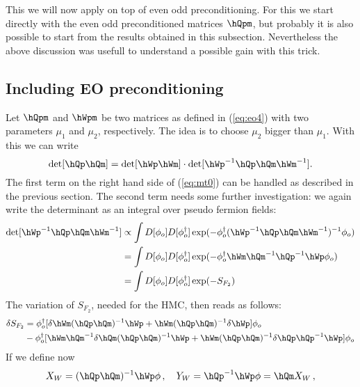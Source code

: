 This we will now apply on top of even odd preconditioning. For this we
start directly with the even odd preconditioned matrices $\hQpm$, but
probably it is also possible to start from the results obtained in
this subsection. Nevertheless the above discussion was usefull to
understand a possible gain with this trick.

\subsection{Including EO preconditioning}

Let $\hQpm$ and $\hWpm$ be two matrices as defined in (\ref{eq:eo4})
with two parameters $\mu_1$ and $\mu_2$, respectively. The idea is to
choose $\mu_2$ bigger than $\mu_1$. With this we can
write
\begin{equation}
  \label{eq:mt0}
  \det[\hQp\hQm] = \det[\hWp\hWm]\cdot\det[\hWp^{-1}\hQp\hQm\hWm^{-1}].
\end{equation}
The first term on the right hand side of (\ref{eq:mt0}) can be handled
as described in the previous section. The second term needs some
further investigation: we again write the determinant as an integral
over pseudo fermion fields:
\begin{equation}
  \label{eq:mt1}
  \begin{split}
    \det[\hWp^{-1}\hQp\hQm\hWm^{-1}]  &\propto \int
    D[\phi_o]D[\phi_o^\dagger]\exp(-\phi_o^\dagger (\hWp^{-1}\hQp\hQm\hWm^{-1})^{-1}
    \phi_o) \\
    &= \int D[\phi_o]D[\phi_o^\dagger]\exp(-\phi_o^\dagger \hWm\hQm^{-1}\hQp^{-1}\hWp\phi_o) \\
    &= \int D[\phi_o]D[\phi_o^\dagger]\exp(-S_{F_2})
  \end{split}
\end{equation}
The variation of $S_{F_2}$, needed for the HMC, then reads as follows:
\begin{equation}
  \label{eq:mt2}
  \begin{split}
    \delta S_{F_2} &= \phi_o^\dagger[\delta\hWm(\hQp\hQm)^{-1}\hWp
    +\hWm(\hQp\hQm)^{-1}\delta\hWp]\phi_o\\
    &-\phi_o^\dagger[\hWm\hQm^{-1}\delta\hQm(\hQp\hQm)^{-1}\hWp +
    \hWm(\hQp\hQm)^{-1}\delta\hQp\hQp^{-1}\hWp]\phi_o
  \end{split}
\end{equation}
If we define now
\begin{equation}
  \label{eq:mt3}
  X_W = (\hQp\hQm)^{-1}\hWp\phi\, ,\quad Y_W = \hQp^{-1}\hWp\phi = \hQm
  X_W\, ,
\end{equation}
